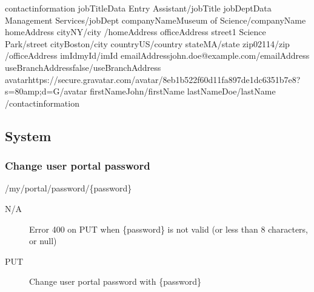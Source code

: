 \documentclass[letterpaper,10pt,english]{sphinxmanual}
\begin{document}
\begin{sphinxVerbatim}[commandchars=\\\{\}]
\PYGZlt{}contact\PYGZhy{}information\PYGZgt{}
\PYGZlt{}jobTitle\PYGZgt{}Data Entry Assistant\PYGZlt{}/jobTitle\PYGZgt{}
\PYGZlt{}jobDept\PYGZgt{}Data Management Services\PYGZlt{}/jobDept\PYGZgt{}
\PYGZlt{}companyName\PYGZgt{}Museum of Science\PYGZlt{}/companyName\PYGZgt{}
\PYGZlt{}homeAddress\PYGZgt{}
\PYGZlt{}city\PYGZgt{}NY\PYGZlt{}/city\PYGZgt{}
\PYGZlt{}/homeAddress\PYGZgt{}
\PYGZlt{}officeAddress\PYGZgt{}
\PYGZlt{}street\PYGZgt{}1 Science Park\PYGZlt{}/street\PYGZgt{}
\PYGZlt{}city\PYGZgt{}Boston\PYGZlt{}/city\PYGZgt{}
\PYGZlt{}country\PYGZgt{}US\PYGZlt{}/country\PYGZgt{}
\PYGZlt{}state\PYGZgt{}MA\PYGZlt{}/state\PYGZgt{}
\PYGZlt{}zip\PYGZgt{}02114\PYGZlt{}/zip\PYGZgt{}
\PYGZlt{}/officeAddress\PYGZgt{}
\PYGZlt{}imId\PYGZgt{}myId\PYGZlt{}/imId\PYGZgt{}
\PYGZlt{}emailAddress\PYGZgt{}john.doe@example.com\PYGZlt{}/emailAddress\PYGZgt{}
\PYGZlt{}useBranchAddress\PYGZgt{}false\PYGZlt{}/useBranchAddress\PYGZgt{}
\PYGZlt{}avatar\PYGZgt{}https://secure.gravatar.com/avatar/8eb1b522f60d11fa897de1dc6351b7e8?s=80\PYGZam{}amp;d=G\PYGZlt{}/avatar\PYGZgt{}
\PYGZlt{}firstName\PYGZgt{}John\PYGZlt{}/firstName\PYGZgt{}
\PYGZlt{}lastName\PYGZgt{}Doe\PYGZlt{}/lastName\PYGZgt{}
\PYGZlt{}/contact\PYGZhy{}information\PYGZgt{}
\end{sphinxVerbatim}


\subsection{System}
\label{\detokenize{restapi:system}}

\subsubsection{Change user portal password}
\label{\detokenize{restapi:change-user-portal-password}}
 /my/portal/password/\{password\}

 N/A
\begin{description}
\item[{}] \leavevmode
Error 400 on PUT when \{password\} is not valid (or less than 8 characters, or null)

\item[{ PUT}] \leavevmode
Change user portal password with \{password\}

\end{description}
\end{document}
